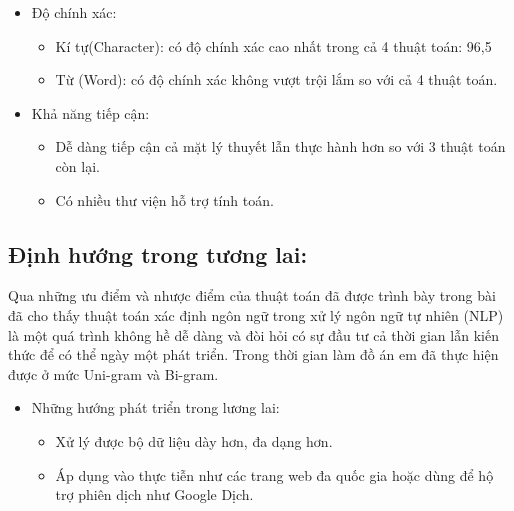 \begin{itemize}

    \item Độ chính xác:
    \begin{itemize}
        \item Kí tự(Character): có độ chính xác cao nhất trong cả 4 thuật toán: 96,5%
        \item Từ (Word): có độ chính xác không vượt trội lắm so với cả 4 thuật toán.
    \end{itemize}
    \item Khả năng tiếp cận: 
    \begin{itemize}
        \item Dễ dàng tiếp cận cả mặt lý thuyết lẫn thực hành hơn so với 3 thuật toán còn lại.
        \item Có nhiều thư viện hỗ trợ tính toán.
    \end{itemize}
    
\end{itemize}

\subsection{Định hướng trong tương lai:}

Qua những ưu điểm và nhược điểm của thuật toán đã được trình bày trong bài đã cho thấy thuật toán xác định ngôn ngữ trong xử lý ngôn ngữ tự nhiên (NLP) là một quá trình không hề dễ dàng và đòi hỏi có sự đầu tư cả thời gian lẫn kiến thức để có thể ngày một phát triển. Trong thời gian làm đồ án em đã thực hiện được ở mức Uni-gram và Bi-gram.

\begin{itemize}
    \item Những hướng phát triển trong lương lai:
\begin{itemize}
    \item Xử lý được bộ dữ liệu dày hơn, đa dạng hơn.
    \item Áp dụng vào thực tiễn như các trang web đa quốc gia hoặc dùng để hộ trợ phiên dịch như Google Dịch.
\end{itemize}
\end{itemize}



